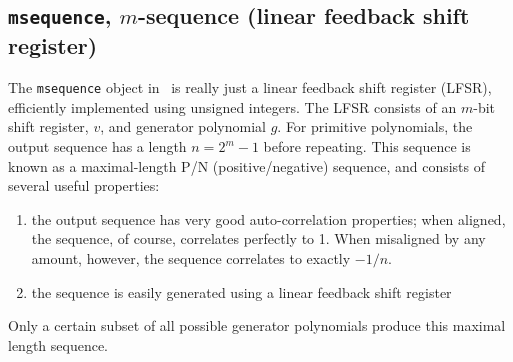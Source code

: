 \subsection{{\tt msequence}, $m$-sequence (linear feedback shift register)}
\label{module:sequence:msequence}
The {\tt msequence} object in \liquid\ is really just a linear feedback shift
register (LFSR), efficiently implemented using unsigned integers.
The LFSR consists of an $m$-bit shift register, $v$, and generator polynomial
$g$.
For primitive polynomials, the output sequence has a length $n=2^m-1$ before
repeating.
This sequence is known as a maximal-length P/N (positive/negative) sequence,
and consists of several useful properties:
%
\begin{enumerate}
\item the output sequence has very good auto-correlation properties; when
      aligned, the sequence, of course, correlates perfectly to 1.
      When misaligned by any amount, however, the sequence correlates to
      exactly $-1/n$.
\item the sequence is easily generated using a linear feedback shift register
\end{enumerate}
%
Only a certain subset of all possible generator polynomials produce this
maximal length sequence.
%
